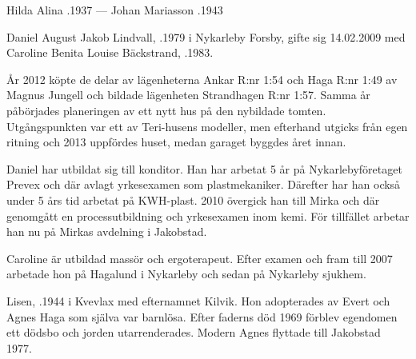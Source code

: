 Hilda Alina .1937  ---   Johan Mariasson .1943



%



%
Daniel August Jakob Lindvall, .1979 i Nykarleby Forsby, gifte sig 14.02.2009 med Caroline Benita Louise Bäckstrand, .1983.

År 2012 köpte de delar av lägenheterna Ankar R:nr 1:54 och Haga R:nr 1:49 av Magnus Jungell och bildade lägenheten Strandhagen R:nr 1:57. Samma år påbörjades planeringen av ett nytt hus på den nybildade tomten. Utgångspunkten var ett av Teri-husens modeller, men efterhand utgicks från egen ritning och 2013 uppfördes huset, medan garaget byggdes året innan.

Daniel har utbildat sig till konditor. Han har arbetat 5 år på Nykarlebyföretaget Prevex och där avlagt yrkesexamen som plastmekaniker. Därefter har han också under 5 års tid arbetat på KWH-plast. 2010 övergick han till Mirka  och där genomgått en processutbildning och yrkesexamen inom kemi. För tillfället arbetar han nu på Mirkas avdelning i Jakobstad.

Caroline är utbildad massör och ergoterapeut. Efter examen och fram till 2007 arbetade hon på Hagalund i Nykarleby och sedan på Nykarleby sjukhem.

\begin{jhchildren}
  \item {}
  \item {}
\end{jhchildren}



%


%
Lisen, .1944 i Kvevlax med efternamnet Kilvik. Hon adopterades av Evert och Agnes Haga som själva var barnlösa. Efter faderns död 1969 förblev egendomen ett dödsbo och jorden utarrenderades. Modern Agnes flyttade till Jakobstad 1977.

